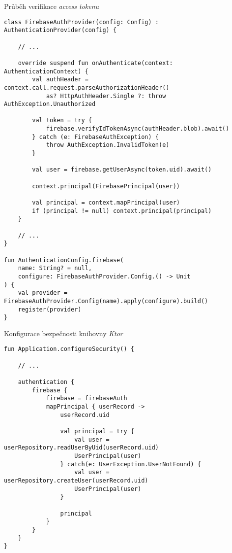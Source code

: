\begin{listing}
\caption{Průběh verifikace \emph{access tokenu}}\label{code:access-token-verification}
\begin{verbatim}
class FirebaseAuthProvider(config: Config) : AuthenticationProvider(config) {

    // ...
    
    override suspend fun onAuthenticate(context: AuthenticationContext) {
        val authHeader = context.call.request.parseAuthorizationHeader() 
            as? HttpAuthHeader.Single ?: throw AuthException.Unauthorized

        val token = try {
            firebase.verifyIdTokenAsync(authHeader.blob).await()
        } catch (e: FirebaseAuthException) {
            throw AuthException.InvalidToken(e)
        }

        val user = firebase.getUserAsync(token.uid).await()

        context.principal(FirebasePrincipal(user))

        val principal = context.mapPrincipal(user)
        if (principal != null) context.principal(principal)
    }
    
    // ...
}

fun AuthenticationConfig.firebase(
    name: String? = null,
    configure: FirebaseAuthProvider.Config.() -> Unit
) {
    val provider = FirebaseAuthProvider.Config(name).apply(configure).build()
    register(provider)
}
\end{verbatim}
\end{listing}

\begin{listing}
\caption{Konfigurace bezpečnosti knihovny \emph{Ktor}}\label{code:ktor-security-config}
\begin{verbatim}
fun Application.configureSecurity() {
    
    // ...
    
    authentication {
        firebase {
            firebase = firebaseAuth
            mapPrincipal { userRecord ->
                userRecord.uid

                val principal = try {
                    val user = userRepository.readUserByUid(userRecord.uid)
                    UserPrincipal(user)
                } catch(e: UserException.UserNotFound) {
                    val user = userRepository.createUser(userRecord.uid)
                    UserPrincipal(user)
                }

                principal
            }
        }
    }
}
\end{verbatim}
\end{listing}

